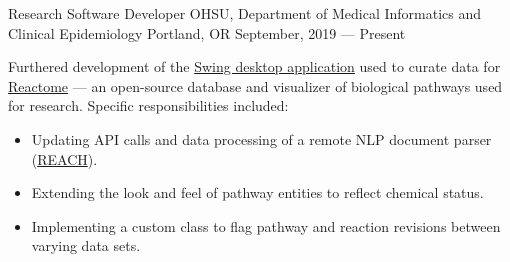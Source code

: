 \showoff
{Research Software Developer}
{OHSU, Department of Medical Informatics and Clinical Epidemiology}
{Portland, OR}
{September, 2019 --- Present}

Furthered development of the {\textcolor{my-blue}{\href{https://github.com/reactome/CuratorTool}{Swing desktop application}}} used to curate data for {\textcolor{my-blue}{\href{https://reactome.org/}{Reactome}}} --- an open-source database and visualizer of biological pathways used for research. Specific responsibilities included:

\begin{itemize}[label=$\triangleright$]
\item Updating API calls and data processing of a remote NLP document parser (\textcolor{my-blue}{\href{https://github.com/clulab/reach}{REACH}}).
\item Extending the look and feel of pathway entities to reflect chemical status.
\item Implementing a custom class to flag pathway and reaction revisions between varying data sets.
\end{itemize}

